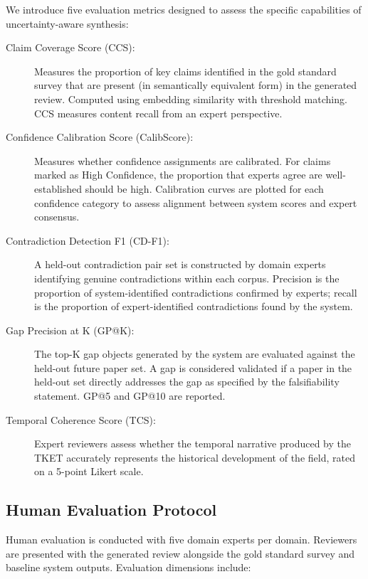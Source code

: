 We introduce five evaluation metrics designed to assess the specific capabilities of uncertainty-aware synthesis:

\begin{description}
    \item[Claim Coverage Score (CCS):] Measures the proportion of key claims identified in the gold standard survey that are present (in semantically equivalent form) in the generated review. Computed using embedding similarity with threshold matching. CCS measures content recall from an expert perspective.

    \item[Confidence Calibration Score (CalibScore):] Measures whether confidence assignments are calibrated. For claims marked as High Confidence, the proportion that experts agree are well-established should be high. Calibration curves are plotted for each confidence category to assess alignment between system scores and expert consensus.

    \item[Contradiction Detection F1 (CD-F1):] A held-out contradiction pair set is constructed by domain experts identifying genuine contradictions within each corpus. Precision is the proportion of system-identified contradictions confirmed by experts; recall is the proportion of expert-identified contradictions found by the system.

    \item[Gap Precision at K (GP@K):] The top-K gap objects generated by the system are evaluated against the held-out future paper set. A gap is considered validated if a paper in the held-out set directly addresses the gap as specified by the falsifiability statement. GP@5 and GP@10 are reported.

    \item[Temporal Coherence Score (TCS):] Expert reviewers assess whether the temporal narrative produced by the TKET accurately represents the historical development of the field, rated on a 5-point Likert scale.
\end{description}

\subsection{Human Evaluation Protocol}

Human evaluation is conducted with five domain experts per domain. Reviewers are presented with the generated review alongside the gold standard survey and baseline system outputs. Evaluation dimensions include:

